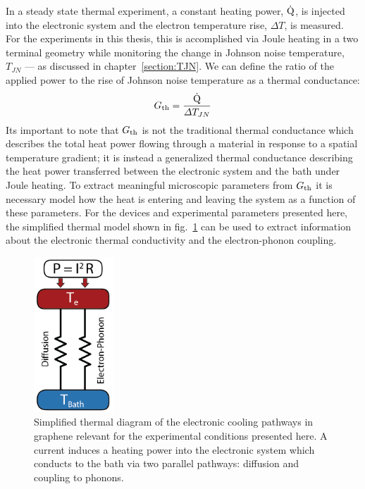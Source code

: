 In a steady state thermal experiment, a constant heating power, $\dot{\mathrm{Q}}$, is injected into the electronic system and the electron temperature rise, $\Delta T$, is measured. For the experiments in this thesis, this is accomplished via Joule heating in a two terminal geometry while monitoring the change in Johnson noise temperature, $T_{JN}$ --- as discussed in chapter~\ref{section:TJN}. We can define the ratio of the applied power to the rise of Johnson noise temperature as a thermal conductance:
\begin{equation}
G_{\mathrm{th}} = \frac{\dot{\mathrm{Q}}}{\Delta T_{JN}}
\end{equation}
Its important to note that $G_{\mathrm{th}}$ is not the traditional thermal conductance which describes the total heat power flowing through a material in response to a spatial temperature gradient; it is instead a generalized thermal conductance describing the heat power transferred between the electronic system and the bath under Joule heating. To extract meaningful microscopic parameters from $G_{\mathrm{th}}$ it is necessary model how the heat is entering and leaving the system as a function of these parameters. For the devices and experimental parameters presented here, the simplified thermal model shown in fig.~\ref{fig:thermal_diagram2} can be used to extract information about the electronic thermal conductivity and the electron-phonon coupling.
\begin{figure}
\centering
\includegraphics[width = 30mm]{figures/thermal_via_noise/thermal_diagram.png}
\caption{Simplified thermal diagram of the electronic cooling pathways in graphene relevant for the experimental conditions presented here. A current induces a heating power into the electronic system which conducts to the bath via two parallel pathways: diffusion and coupling to phonons.}
\label{fig:thermal_diagram2}
\end{figure}

